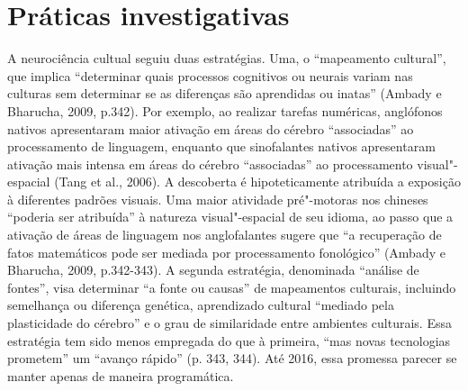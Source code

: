 \chapter{Práticas investigativas}

A neurociência cultual seguiu duas estratégias. Uma, o ``mapeamento
cultural'', que implica ``determinar quais processos cognitivos ou
neurais variam nas culturas sem determinar se as diferenças são
aprendidas ou inatas'' (Ambady e Bharucha, 2009, p.342). Por exemplo, ao
realizar tarefas numéricas, anglófonos nativos apresentaram maior
ativação em áreas do cérebro ``associadas'' ao processamento de
linguagem, enquanto que sinofalantes nativos apresentaram ativação mais
intensa em áreas do cérebro ``associadas'' ao processamento
visual"-espacial (Tang et al., 2006). A descoberta é hipoteticamente
atribuída a exposição à diferentes padrões visuais. Uma maior atividade
pré"-motoras nos chineses ``poderia ser atribuída'' à natureza
visual"-espacial de seu idioma, ao passo que a ativação de áreas de
linguagem nos anglofalantes sugere que ``a recuperação de fatos
matemáticos pode ser mediada por processamento fonológico'' (Ambady e
Bharucha, 2009, p.342-343). A segunda estratégia, denominada ``análise
de fontes'', visa determinar ``a fonte ou causas'' de mapeamentos
culturais, incluindo semelhança ou diferença genética, aprendizado
cultural ``mediado pela plasticidade do cérebro'' e o grau de
similaridade entre ambientes culturais. Essa estratégia tem sido menos
empregada do que à primeira, ``mas novas tecnologias prometem'' um
``avanço rápido'' (p. 343, 344). Até 2016, essa promessa parecer se
manter apenas de maneira programática.

